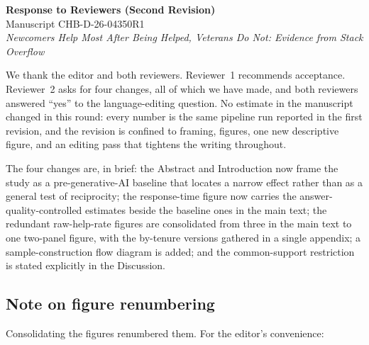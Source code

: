 \documentclass[11pt]{article}
\begin{document}
\begin{center}
{\large\bfseries Response to Reviewers (Second Revision)}\\[2pt]
Manuscript CHB-D-26-04350R1\\
\emph{Newcomers Help Most After Being Helped, Veterans Do Not: Evidence from Stack Overflow}
\end{center}

We thank the editor and both reviewers. Reviewer~1 recommends acceptance. Reviewer~2 asks for four changes, all of which we have made, and both reviewers answered ``yes'' to the language-editing question. No estimate in the manuscript changed in this round: every number is the same pipeline run reported in the first revision, and the revision is confined to framing, figures, one new descriptive figure, and an editing pass that tightens the writing throughout.

The four changes are, in brief: the Abstract and Introduction now frame the study as a pre-generative-AI baseline that locates a narrow effect rather than as a general test of reciprocity; the response-time figure now carries the answer-quality-controlled estimates beside the baseline ones in the main text; the redundant raw-help-rate figures are consolidated from three in the main text to one two-panel figure, with the by-tenure versions gathered in a single appendix; a sample-construction flow diagram is added; and the common-support restriction is stated explicitly in the Discussion.

\subsection*{Note on figure renumbering}

Consolidating the figures renumbered them. For the editor's convenience:
\end{document}
